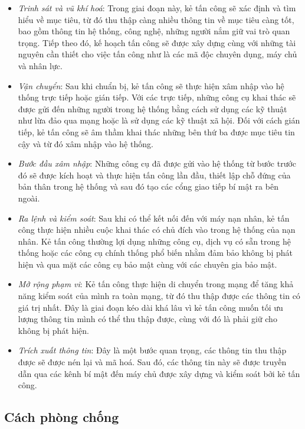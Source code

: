 \begin{itemize}
    \item \textit{Trinh sát và vũ khí hoá}: Trong giai đoạn này, kẻ tấn công sẽ xác định và tìm hiểu về mục tiêu, từ đó thu thập càng nhiều thông tin về mục tiêu càng tốt, bao gồm thông tin hệ thống, công nghệ, những người nắm giữ vai trò quan trọng. Tiếp theo đó, kế hoạch tấn công sẽ được xây dựng cùng với những tài nguyên cần thiết cho việc tấn công như là các mã độc chuyên dụng, máy chủ và nhân lực.
    \item \textit{Vận chuyển}: Sau khi chuẩn bị, kẻ tấn công sẽ thực hiện xâm nhập vào hệ thống trực tiếp hoặc gián tiếp. Với các trực tiếp, những công cụ khai thác sẽ được gửi đến những người trong hệ thống bằng cách sử dụng các kỹ thuật như lừa đảo qua mạng hoặc là sử dụng các kỹ thuật xã hội. Đối với cách gián tiếp, kẻ tấn công sẽ âm thầm khai thác những bên thứ ba được mục tiêu tin cậy và từ đó xâm nhập vào hệ thống.
    \item \textit{Bước đầu xâm nhập}: Những công cụ đã được gửi vào hệ thống từ bước trước đó sẽ được kích hoạt và thực hiện tấn công lần đầu, thiết lập chỗ đứng của bản thân trong hệ thống và sau đó tạo các cổng giao tiếp bí mật ra bên ngoài.
    \item \textit{Ra lệnh và kiểm soát}: Sau khi có thể kết nối đến với máy nạn nhân, kẻ tấn công thực hiện nhiều cuộc khai thác có chủ đích vào trong hệ thống của nạn nhân. Kẻ tấn công thường lợi dụng những công cụ, dịch vụ có sẵn trong hệ thống hoặc các công cụ chính thống phổ biến nhằm đảm bảo không bị phát hiện và qua mặt các công cụ bảo mật cùng với các chuyên gia bảo mật.
    \item \textit{Mở rộng phạm vi}: Kẻ tấn công thực hiện di chuyển trong mạng để tăng khả năng kiểm soát của mình ra toàn mạng, từ đó thu thập được các thông tin có giá trị nhất. Đây là giai đoạn kéo dài khá lâu vì kẻ tấn công muốn tối ưu lượng thông tin mình có thể thu thập được, cùng với đó là phải giữ cho không bị phát hiện.
    \item  \textit{Trích xuất thông tin}: Đây là một bước quan trọng, các thông tin thu thập được sẽ được nén lại và mã hoá. Sau đó, các thông tin này sẽ được truyền dẫn qua các kênh bí mật đến máy chủ được xây dựng và kiểm soát bởi kẻ tấn công.
\end{itemize}

\subsection{Cách phòng chống}

